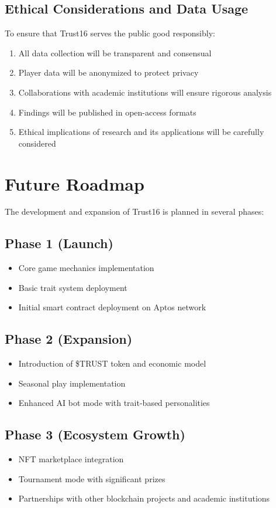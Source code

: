 \documentclass[]{article}
\begin{document}
\subsection{Ethical Considerations and Data Usage}

To ensure that Trust16 serves the public good responsibly:

\begin{enumerate}
\item All data collection will be transparent and consensual
\item Player data will be anonymized to protect privacy
\item Collaborations with academic institutions will ensure rigorous analysis
\item Findings will be published in open-access formats
\item Ethical implications of research and its applications will be carefully considered
\end{enumerate}

\section{Future Roadmap}

The development and expansion of Trust16 is planned in several phases:

\subsection{Phase 1 (Launch)}
\begin{itemize}
\item Core game mechanics implementation
\item Basic trait system deployment
\item Initial smart contract deployment on Aptos network
\end{itemize}

\subsection{Phase 2 (Expansion)}
\begin{itemize}
\item Introduction of \$TRUST token and economic model
\item Seasonal play implementation
\item Enhanced AI bot mode with trait-based personalities
\end{itemize}

\subsection{Phase 3 (Ecosystem Growth)}
\begin{itemize}
\item NFT marketplace integration
\item Tournament mode with significant prizes
\item Partnerships with other blockchain projects and academic institutions
\end{itemize}
\end{document}
